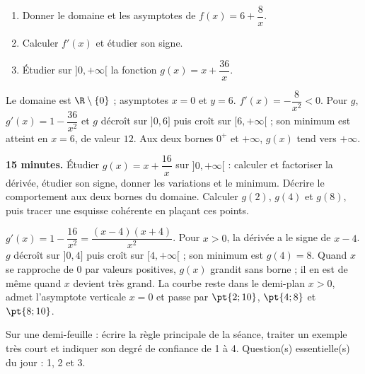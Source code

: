 \begin{exercise}[essentiel]
\begin{enumerate}\item Donner le domaine et les asymptotes de $f(x)=6+\dfrac{8}x$.\item Calculer $f'(x)$ et étudier son signe.\item Étudier sur $]0,+\infty[$ la fonction $g(x)=x+\dfrac{36}x$.\end{enumerate}
\end{exercise}
\begin{solution}Le domaine est $\R\setminus\{0\}$ ; asymptotes $x=0$ et $y=6$. $f'(x)=-\dfrac{8}{x^2}<0$. Pour $g$, $g'(x)=1-\dfrac{36}{x^2}$ et $g$ décroît sur $]0,6]$ puis croît sur $[6,+\infty[$ ; son minimum est atteint en $x=6$, de valeur $12$. Aux deux bornes $0^+$ et $+\infty$, $g(x)$ tend vers $+\infty$.\end{solution}


\begin{homework}\textbf{15 minutes.} Étudier $g(x)=x+\dfrac{16}{x}$ sur $]0,+\infty[$ : calculer et factoriser la dérivée, étudier son signe, donner les variations et le minimum. Décrire le comportement aux deux bornes du domaine. Calculer $g(2)$, $g(4)$ et $g(8)$, puis tracer une esquisse cohérente en plaçant ces points.\end{homework}
\begin{solution}$g'(x)=1-\dfrac{16}{x^2}=\dfrac{(x-4)(x+4)}{x^2}$. Pour $x>0$, la dérivée a le signe de $x-4$. $g$ décroît sur $]0,4]$ puis croît sur $[4,+\infty[$ ; son minimum est $g(4)=8$. Quand $x$ se rapproche de $0$ par valeurs positives, $g(x)$ grandit sans borne ; il en est de même quand $x$ devient très grand. La courbe reste dans le demi-plan $x>0$, admet l'asymptote verticale $x=0$ et passe par $\pt{2;10}$, $\pt{4;8}$ et $\pt{8;10}$.\end{solution}

\begin{exitticket}[3 minutes]Sur une demi-feuille : écrire la règle principale de la séance, traiter un exemple très court et indiquer son degré de confiance de 1 à 4. Question(s) essentielle(s) du jour : 1, 2 et 3.\end{exitticket}

